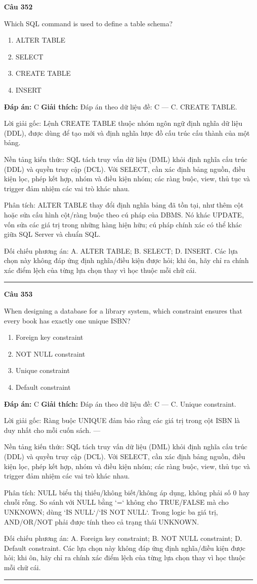 \documentclass[11pt,a4paper]{article}
\newenvironment{question}[1]{%
  \par\vspace{1em}\noindent\textbf{\large Câu #1}\par\vspace{0.4em}
}{%
  \par\vspace{1em}\hrule\vspace{0.6em}
}
\newenvironment{choices}{%
  \begin{enumerate}[label=\textbf{\Alph*.},leftmargin=2.2em,itemsep=2pt,topsep=3pt]
}{%
  \end{enumerate}
}
\newcommand{\choice}{\item}
\begin{document}
\begin{question}{352}
Which SQL command is used to define a table schema?
\begin{choices}
\choice ALTER TABLE
\choice SELECT
\choice CREATE TABLE
\choice INSERT
\end{choices}
\textbf{Đáp án:} C
\textbf{Giải thích:} Đáp án theo dữ liệu đề: C — C. CREATE TABLE.

Lời giải gốc: Lệnh CREATE TABLE thuộc nhóm ngôn ngữ định nghĩa dữ liệu (DDL), được dùng để tạo mới và định nghĩa lược đồ cấu trúc cấu thành của một bảng.

Nền tảng kiến thức: SQL tách truy vấn dữ liệu (DML) khỏi định nghĩa cấu trúc (DDL) và quyền truy cập (DCL). Với SELECT, cần xác định bảng nguồn, điều kiện lọc, phép kết hợp, nhóm và điều kiện nhóm; các ràng buộc, view, thủ tục và trigger đảm nhiệm các vai trò khác nhau.

Phân tích: ALTER TABLE thay đổi định nghĩa bảng đã tồn tại, như thêm cột hoặc sửa cấu hình cột/ràng buộc theo cú pháp của DBMS. Nó khác UPDATE, vốn sửa các giá trị trong những hàng hiện hữu; cú pháp chính xác có thể khác giữa SQL Server và chuẩn SQL.

Đối chiếu phương án: A. ALTER TABLE; B. SELECT; D. INSERT. Các lựa chọn này không đáp ứng định nghĩa/điều kiện được hỏi; khi ôn, hãy chỉ ra chính xác điểm lệch của từng lựa chọn thay vì học thuộc mỗi chữ cái.
\end{question}

\begin{question}{353}
When designing a database for a library system, which constraint ensures that every book has exactly one unique ISBN?
\begin{choices}
\choice Foreign key constraint
\choice NOT NULL constraint
\choice Unique constraint
\choice Default constraint
\end{choices}
\textbf{Đáp án:} C
\textbf{Giải thích:} Đáp án theo dữ liệu đề: C — C. Unique constraint.

Lời giải gốc: Ràng buộc UNIQUE đảm bảo rằng các giá trị trong cột ISBN là duy nhất cho mỗi cuốn sách. ---

Nền tảng kiến thức: SQL tách truy vấn dữ liệu (DML) khỏi định nghĩa cấu trúc (DDL) và quyền truy cập (DCL). Với SELECT, cần xác định bảng nguồn, điều kiện lọc, phép kết hợp, nhóm và điều kiện nhóm; các ràng buộc, view, thủ tục và trigger đảm nhiệm các vai trò khác nhau.

Phân tích: NULL biểu thị thiếu/không biết/không áp dụng, không phải số 0 hay chuỗi rỗng. So sánh với NULL bằng `=` không cho TRUE/FALSE mà cho UNKNOWN; dùng `IS NULL`/`IS NOT NULL`. Trong logic ba giá trị, AND/OR/NOT phải được tính theo cả trạng thái UNKNOWN.

Đối chiếu phương án: A. Foreign key constraint; B. NOT NULL constraint; D. Default constraint. Các lựa chọn này không đáp ứng định nghĩa/điều kiện được hỏi; khi ôn, hãy chỉ ra chính xác điểm lệch của từng lựa chọn thay vì học thuộc mỗi chữ cái.
\end{question}
\end{document}
